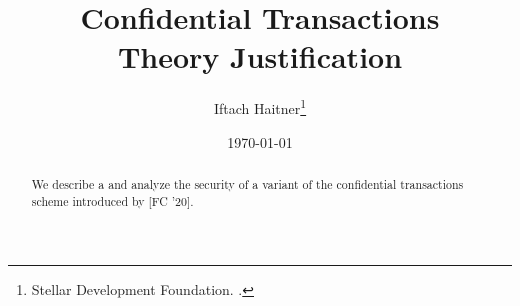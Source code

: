 \documentclass[11pt]{article}
\title{Confidential Transactions  \\ Theory Justification}
\author{Iftach Haitner\thanks{Stellar Development Foundation. \email{ iftach.haitner@stellar.org}.}}
\date{\today}
\begin{document}
 
 \sloppy
 
  
\maketitle


\begin{abstract}
We describe a and analyze the security of  a variant of the confidential transactions   scheme introduced by  \citeauthor {BunzAZB20} [FC '20]. 
\end{abstract}

\tableofcontents
\newpage 







\printbibliography
\end{document}

